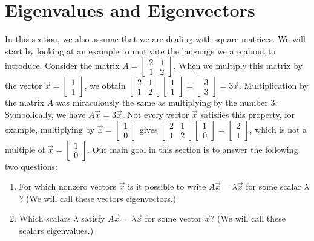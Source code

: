 \section{Eigenvalues and Eigenvectors}
In this section, we also assume that we are dealing with square matrices.  We will start by looking at an example to motivate the language we are about to introduce.  Consider the matrix
$A=\begin{bmatrix} 2&1\\1&2\end{bmatrix} $.  When we multiply this matrix by the vector 
$\vec x = \begin{bmatrix} 1\\1\end{bmatrix} $, 
we obtain 
$\begin{bmatrix} 2&1\\1&2\end{bmatrix} \begin{bmatrix} 1\\1\end{bmatrix} = \begin{bmatrix} 3\\3\end{bmatrix}=3\vec x$. Multiplication by the matrix $A$ was miraculously the same as multiplying by the number 3. Symbolically, we have $A\vec x = 3\vec x$. 
Not every vector $\vec x$ satisfies this property, for example, multiplying by 
$\vec x = \begin{bmatrix} 1\\0\end{bmatrix} $ 
gives  
$\begin{bmatrix} 2&1\\1&2\end{bmatrix} \begin{bmatrix} 1\\0\end{bmatrix} = \begin{bmatrix} 2\\1\end{bmatrix}$, which is not a multiple of $\vec x = \begin{bmatrix} 1\\0\end{bmatrix} $. Our main goal in this section is to answer the following two questions:
\begin{enumerate}
	\item For which nonzero vectors $\vec x$ is it possible to write $A\vec x = \lambda \vec x$ for some scalar $\lambda$? (We will call these vectors eigenvectors.)
	\item Which scalars $\lambda$ satisfy $A\vec x = \lambda \vec x$ for some vector $\vec x$? (We will call these scalars eigenvalues.)
\end{enumerate}


